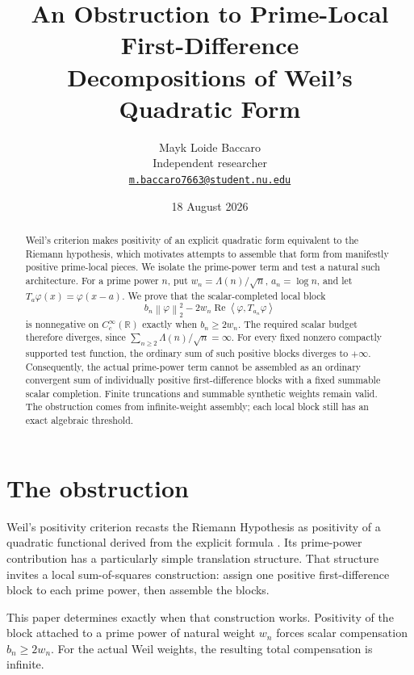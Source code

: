 \documentclass[11pt,a4paper]{amsart}
\title[Prime-local first-difference obstruction]
{An Obstruction to Prime-Local First-Difference\\
Decompositions of Weil's Quadratic Form}
\author[Mayk Loide Baccaro]{Mayk Loide Baccaro\\
Independent researcher\\
\href{mailto:m.baccaro7663@student.nu.edu}{\texttt{m.baccaro7663@student.nu.edu}}}
\date{18 August 2026}
\newcommand{\R}{\mathbb{R}}
\newcommand{\ip}[2]{\left\langle #1,#2\right\rangle}
\newcommand{\norm}[1]{\left\lVert #1\right\rVert_{2}}
\theoremstyle{plain}
\theoremstyle{definition}
\begin{document}
\begin{abstract}
Weil's criterion makes positivity of an explicit quadratic form equivalent
to the Riemann hypothesis, which motivates attempts to assemble that form
from manifestly positive prime-local pieces.  We isolate the prime-power term
and test a natural such architecture.  For a prime power
$n$, put $w_n=\Lambda(n)/\sqrt n$, $a_n=\log n$, and let
$T_a\varphi(x)=\varphi(x-a)$.  We prove that the scalar-completed local block
\[
 b_n\norm{\varphi}^{2}-2w_n\operatorname{Re}
 \ip{\varphi}{T_{a_n}\varphi}
\]
is nonnegative on $C_c^\infty(\R)$ exactly when $b_n\geq 2w_n$.
The required scalar budget therefore diverges, since
$\sum_{n\geq2}\Lambda(n)/\sqrt n=\infty$.  For every fixed
nonzero compactly supported test function, the ordinary sum of such positive
blocks diverges to $+\infty$.  Consequently, the actual prime-power term
cannot be assembled as an ordinary convergent sum of individually positive
first-difference blocks with a fixed summable scalar completion.  Finite
truncations and summable synthetic weights remain valid.  The obstruction
comes from infinite-weight assembly; each local block still has an exact
algebraic threshold.
\end{abstract}

\maketitle

\section{The obstruction}

Weil's positivity criterion recasts the Riemann Hypothesis as positivity of a
quadratic functional derived from the explicit formula
\cite{Weil1952,Bombieri2000,Conrey2003,Lagarias2007}.  Its prime-power contribution has a
particularly simple translation structure.  That structure invites a local
sum-of-squares construction: assign one positive first-difference block to
each prime power, then assemble the blocks.

This paper determines exactly when that construction works.  Positivity of
the block attached to a prime power of natural weight $w_n$ forces scalar
compensation $b_n\geq2w_n$.  For the actual Weil weights, the resulting total
compensation is infinite.
\end{document}

